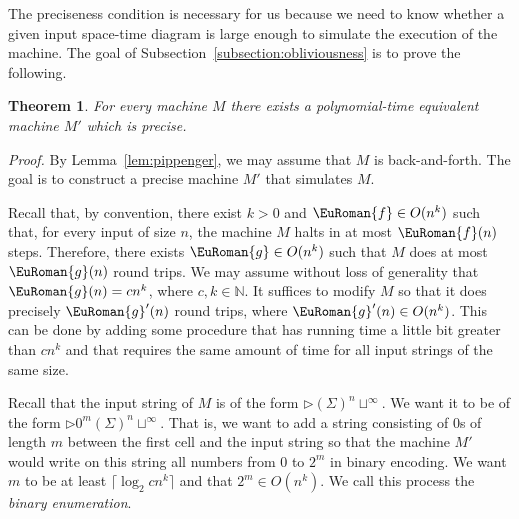 \documentclass[10pt,a4paper]{amsart}
\theoremstyle{plain}
\newtheorem{thm}{Theorem}[section]
\theoremstyle{definition}
\numberwithin{equation}{section}
\renewcommand{\proof}[1][Proof]{\par\noindent\textit{#1.}\enspace\ignorespaces}
\newcommand{\eurm}[1]{\EuRoman{#1}} %
\newcommand{\func}[1]{\eurm{#1}}  %
\begin{document}
The preciseness condition is necessary for us because we need to know whether a given input space-time diagram is large enough to simulate the execution of the machine. The goal of Subsection~\ref{subsection:obliviousness} is to prove the following.
\begin{thm}\label{th:precise}
For every machine $M$ there exists a polynomial-time equivalent machine $M'$ which is precise.
\end{thm}
\proof
By Lemma~\ref{lem:pippenger}, we may assume that $M$ is back-and-forth. The goal is to construct a precise machine $M'$ that simulates $M$. 

Recall that, by convention, there exist $k>0$ and $\func{f}\in O(n^k)$ such that, for every input of size $n$, the machine $M$ halts in at most $\func{f}(n)$ steps. Therefore, there exists $\func{g}\in O(n^k)$ such that $M$ does at most $\func{g}(n)$ round trips. 
We may assume without loss of generality that $\func{g}(n)=cn^k$, where $c,k\in\mathbb{N}$. 
It suffices to modify $M$ so that it does precisely $\func{g}'(n)$ round trips, where $\func{g}'(n)\in O(n^k)$.
This can be done by adding some procedure that has running time a little bit greater than $cn^k$ and that requires the same amount of time for all input strings of the same size.

Recall that the input string of $M$ is of the form $\triangleright(\Sigma)^n\sqcup^\infty$. 
We want it to be of the form $\triangleright0^{m}(\Sigma)^n\sqcup^\infty$. 
That is, we want to add a string consisting of $0$s of length $m$ between the first cell and the input string so that the machine $M'$ would write on this string all numbers from $0$ to $2^{m}$ in binary encoding.
We want $m$ to be at least $\lceil\log_2 cn^k\rceil$ and that $2^m\in O(n^k)$.
We call this process the \emph{binary enumeration}. 
\end{document}
